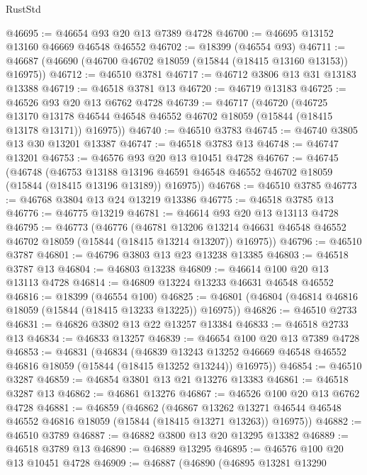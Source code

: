 \begin{lexlean}{RustStd}
\begin{coremodule}
@46695 := @46654 @93 @20 @13 @7389 @4728
@46700 := @46695 @13152 @13160 @46669 @46548 @46552
@46702 := @18399 (@46554 @93)
@46711 := @46687 (@46690 (@46700 @46702 @18059 (@15844 (@18415 @13160 @13153)) @16975))
@46712 := @46510 @3781
@46717 := @46712 @3806 @13 @31 @13183 @13388
@46719 := @46518 @3781 @13
@46720 := @46719 @13183
@46725 := @46526 @93 @20 @13 @6762 @4728
@46739 := @46717
    (@46720
      (@46725
        @13170
        @13178
        @46544
        @46548
        @46552
        @46702
        @18059
        (@15844 (@18415 @13178 @13171))
        @16975))
@46740 := @46510 @3783
@46745 := @46740 @3805 @13 @30 @13201 @13387
@46747 := @46518 @3783 @13
@46748 := @46747 @13201
@46753 := @46576 @93 @20 @13 @10451 @4728
@46767 := @46745
    (@46748
      (@46753
        @13188
        @13196
        @46591
        @46548
        @46552
        @46702
        @18059
        (@15844 (@18415 @13196 @13189))
        @16975))
@46768 := @46510 @3785
@46773 := @46768 @3804 @13 @24 @13219 @13386
@46775 := @46518 @3785 @13
@46776 := @46775 @13219
@46781 := @46614 @93 @20 @13 @13113 @4728
@46795 := @46773
    (@46776
      (@46781
        @13206
        @13214
        @46631
        @46548
        @46552
        @46702
        @18059
        (@15844 (@18415 @13214 @13207))
        @16975))
@46796 := @46510 @3787
@46801 := @46796 @3803 @13 @23 @13238 @13385
@46803 := @46518 @3787 @13
@46804 := @46803 @13238
@46809 := @46614 @100 @20 @13 @13113 @4728
@46814 := @46809 @13224 @13233 @46631 @46548 @46552
@46816 := @18399 (@46554 @100)
@46825 := @46801 (@46804 (@46814 @46816 @18059 (@15844 (@18415 @13233 @13225)) @16975))
@46826 := @46510 @2733
@46831 := @46826 @3802 @13 @22 @13257 @13384
@46833 := @46518 @2733 @13
@46834 := @46833 @13257
@46839 := @46654 @100 @20 @13 @7389 @4728
@46853 := @46831
    (@46834
      (@46839
        @13243
        @13252
        @46669
        @46548
        @46552
        @46816
        @18059
        (@15844 (@18415 @13252 @13244))
        @16975))
@46854 := @46510 @3287
@46859 := @46854 @3801 @13 @21 @13276 @13383
@46861 := @46518 @3287 @13
@46862 := @46861 @13276
@46867 := @46526 @100 @20 @13 @6762 @4728
@46881 := @46859
    (@46862
      (@46867
        @13262
        @13271
        @46544
        @46548
        @46552
        @46816
        @18059
        (@15844 (@18415 @13271 @13263))
        @16975))
@46882 := @46510 @3789
@46887 := @46882 @3800 @13 @20 @13295 @13382
@46889 := @46518 @3789 @13
@46890 := @46889 @13295
@46895 := @46576 @100 @20 @13 @10451 @4728
@46909 := @46887
    (@46890
      (@46895
        @13281
        @13290

\end{coremodule}
\end{lexlean}
